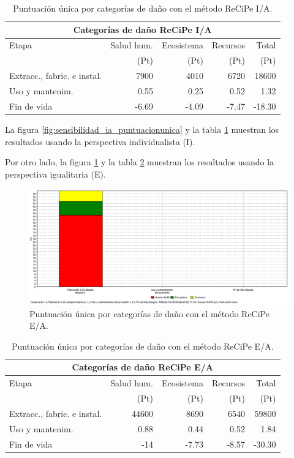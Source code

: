 \begin{table}[!htb]
\centering
\begin{tabular}{p{6cm}rrrr}
\toprule
\multicolumn{5}{c}{Categorías de daño ReCiPe I/A}\\
\midrule
Etapa & Salud hum. & Ecosistema & Recursos & Total\\
 & (Pt) & (Pt) & (Pt) & (Pt)\\
\midrule
Extracc., fabric. e instal. & 7900 & 4010 & 6720 & 18600\\
Uso y mantenim. & 0.55 & 0.25 & 0.52 & 1.32\\
Fin de vida & -6.69 & -4.09 & -7.47 & -18.30\\
\bottomrule
\end{tabular}
\caption{Puntuación única por categorías de daño con el método ReCiPe I/A.}
\label{sensibilidad_ia_puntuacionunica}
\end{table}
La figura \ref{fig:sensibilidad_ia_puntuacionunica} y la tabla \ref{sensibilidad_ia_puntuacionunica} muestran los resultados usando la perspectiva individualista (I).

Por otro lado, la figura \ref{fig:sensibilidad_ea_puntuacionunica} y la tabla \ref{sensibilidad_ea_puntuacionunica} muestran los resultados usando la perspectiva igualitaria (E).

\begin{figure}[!htb]
\centering
\includegraphics[width=15cm]{img/sensibilidad_ea_puntuacionunica.png}
\caption{Puntuación única por categorías de daño con el método ReCiPe E/A.}
\label{fig:sensibilidad_ea_puntuacionunica}
\end{figure}

\begin{table}[!htb]
\centering
\begin{tabular}{p{6cm}rrrr}
\toprule
\multicolumn{5}{c}{Categorías de daño ReCiPe E/A}\\
\midrule
Etapa & Salud hum. & Ecosistema & Recursos & Total\\
 & (Pt) & (Pt) & (Pt) & (Pt)\\
\midrule
Extracc., fabric. e instal. & 44600 & 8690 & 6540 & 59800\\
Uso y mantenim. & 0.88 & 0.44 & 0.52 & 1.84\\
Fin de vida & -14 & -7.73 & -8.57 & -30.30\\
\bottomrule
\end{tabular}
\caption{Puntuación única por categorías de daño con el método ReCiPe E/A.}
\label{sensibilidad_ea_puntuacionunica}
\end{table}

